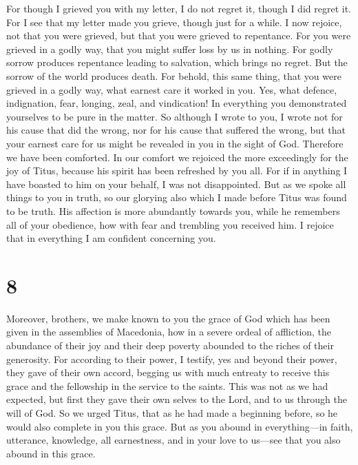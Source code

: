  For though I grieved you with my letter, I do not regret
it, though I did regret it. For I see that my letter made you grieve,
though just for a while.  I now rejoice, not that you were
grieved, but that you were grieved to repentance. For you were grieved
in a godly way, that you might suffer loss by us in nothing.
 For godly sorrow produces repentance leading to salvation,
which brings no regret. But the sorrow of the world produces death.
 For behold, this same thing, that you were grieved in a
godly way, what earnest care it worked in you. Yes, what defence,
indignation, fear, longing, zeal, and vindication! In everything you
demonstrated yourselves to be pure in the matter.  So
although I wrote to you, I wrote not for his cause that did the wrong,
nor for his cause that suffered the wrong, but that your earnest care
for us might be revealed in you in the sight of God. 
Therefore we have been comforted. In our comfort we rejoiced the more
exceedingly for the joy of Titus, because his spirit has been refreshed
by you all.  For if in anything I have boasted to him on
your behalf, I was not disappointed. But as we spoke all things to you
in truth, so our glorying also which I made before Titus was found to be
truth.  His affection is more abundantly towards you, while
he remembers all of your obedience, how with fear and trembling you
received him.  I rejoice that in everything I am confident
concerning you.

\hypertarget{section-7}{%
\section{8}\label{section-7}}

 Moreover, brothers, we make known to you the grace of God
which has been given in the assemblies of Macedonia,  how in
a severe ordeal of affliction, the abundance of their joy and their deep
poverty abounded to the riches of their generosity.  For
according to their power, I testify, yes and beyond their power, they
gave of their own accord,  begging us with much entreaty to
receive this grace and the fellowship in the service to the saints.
 This was not as we had expected, but first they gave their
own selves to the Lord, and to us through the will of God. 
So we urged Titus, that as he had made a beginning before, so he would
also complete in you this grace.  But as you abound in
everything---in faith, utterance, knowledge, all earnestness, and in
your love to us---see that you also abound in this grace.

